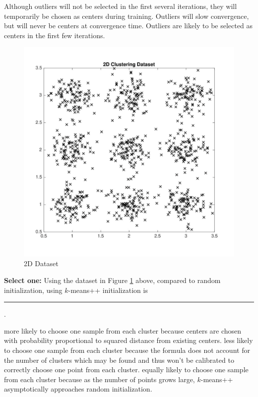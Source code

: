 \documentclass[11pt,addpoints,answers]{exam}
\newcommand{\sone}{\textbf{Select one: }}
\begin{document}
\begin{questions}
\begin{parts}
\begin{subparts}
    \begin{checkboxes}
    \choice Although outliers will not be selected in the first several iterations, they will temporarily be chosen as centers during training.
    \choice Outliers will slow convergence, but will never be centers at convergence time.
    \CorrectChoice Outliers are likely to be selected as centers in the first few iterations.
    \end{checkboxes}
    \clearpage
    \begin{figure}[H]
        \centering
        \includegraphics[width=0.5\linewidth, height=0.5\linewidth]{figures/kmeans.png}
        \caption{2D Dataset}
        \label{fig:KMeans2}
    \end{figure}
    
    
    \subpart[1] 

    \sone Using the dataset in Figure \ref{fig:KMeans2} above, compared to random initialization, using $k$-means++ initialization is \rule{1cm}{0.01mm}.

    
    \begin{checkboxes}
    \CorrectChoice more likely to choose one sample from each cluster because centers are chosen with probability proportional to squared distance from existing centers.
    \choice less likely to choose one sample from each cluster because the formula does not account for the number of clusters which may be found and thus won't be calibrated to correctly choose one point from each cluster.
    \choice equally likely to choose one sample from each cluster because as the number of points grows large, $k$-means++ asymptotically approaches random initialization.
    
    \end{checkboxes}



\end{subparts}
\end{parts}
\end{questions}
\end{document}
